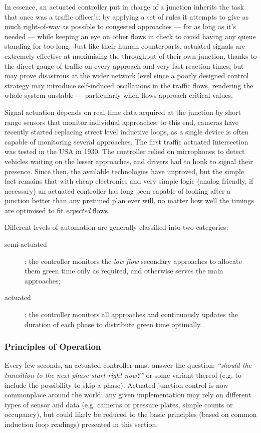 In essence, an actuated controller put in charge of a junction inherits the task that
once was a traffic officer’s: by applying a set of rules it attempts to give as much right-of-way
as possible to congested approaches — for as long as it’s needed — while keeping an eye on other
flows in check to avoid having any queue standing for too long. Just like their human
counterparts, actuated signals are extremely effective at maximising the throughput of their
own junction, thanks to the direct gauge of traffic on every approach and very fast reaction
times, but may prove disastrous at the wider network level since a poorly designed control
strategy may introduce self-induced oscillations in the traffic flows, rendering the whole
system unstable — particularly when flows approach critical values.

Signal actuation depends on real time data acquired at the junction by short range sensors
that monitor individual approaches: to this end, cameras have recently started replacing street
level inductive loops, as a single device is often capable of monitoring several approaches.
The first traffic actuated intersection was tested in the USA in 1930. The controller relied
on microphones to detect vehicles waiting on the lesser approaches, and drivers had to honk to signal their presence. Since then, the available technologies have improved, but the simple
fact remains that with cheap electronics and very simple logic (analog friendly, if necessary)
an actuated controller has long been capable of looking after a junction better than any pretimed
plan ever will, no matter how well the timings are optimised to fit \emph{expected} flows.

Different levels of automation are generally classified into two categories:
\begin{description}
\item[semi-actuated]: the controller monitors the \emph{low flow} secondary approaches to allocate them green time only as required, and otherwise serves the main approaches;
\item[actuated]: the controller monitors all approaches and continuously updates the duration of each phase to distribute green time optimally.
\end{description}

\subsubsection*{Principles of Operation}
Every few seconds, an actuated controller must answer the question: \textit{“should the
transition to the next phase start right now?”} or some variant thereof (e.g. to include the
possibility to skip a phase). Actuated junction control is now commonplace around the world:
any given implementation may rely on different types of sensor and data (e.g. cameras or
pressure plates, simple counts or occupancy), but could likely be reduced to the basic
principles (based on common induction loop readings) presented in this section.


